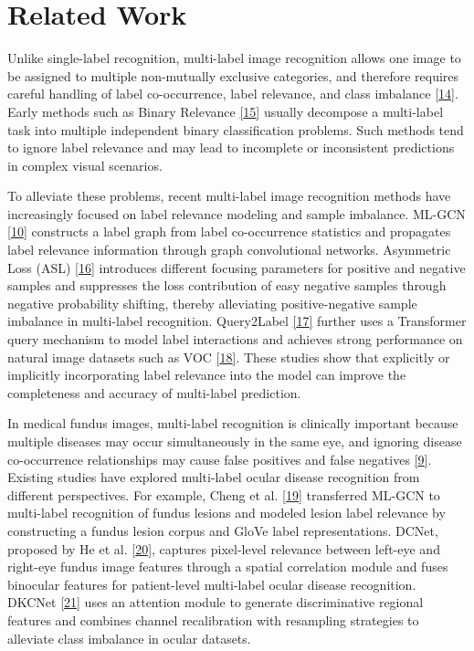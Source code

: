 
\section{Related Work}


Unlike single-label recognition, multi-label image recognition allows one image to be assigned to multiple non-mutually exclusive categories, and therefore requires careful handling of label co-occurrence, label relevance, and class imbalance \hyperref[_Ref213949872]{{[}14{]}}. Early methods such as Binary Relevance \hyperref[_Ref213949896]{{[}15{]}} usually decompose a multi-label task into multiple independent binary classification problems. Such methods tend to ignore label relevance and may lead to incomplete or inconsistent predictions in complex visual scenarios.

To alleviate these problems, recent multi-label image recognition methods have increasingly focused on label relevance modeling and sample imbalance. ML-GCN \hyperref[_Ref213949382]{{[}10{]}} constructs a label graph from label co-occurrence statistics and propagates label relevance information through graph convolutional networks. Asymmetric Loss (ASL) \hyperref[_Ref213949927]{{[}16{]}} introduces different focusing parameters for positive and negative samples and suppresses the loss contribution of easy negative samples through negative probability shifting, thereby alleviating positive-negative sample imbalance in multi-label recognition. Query2Label \hyperref[_Ref213950246]{{[}17{]}} further uses a Transformer query mechanism to model label interactions and achieves strong performance on natural image datasets such as VOC \hyperref[_Ref213950282]{{[}18{]}}. These studies show that explicitly or implicitly incorporating label relevance into the model can improve the completeness and accuracy of multi-label prediction.

In medical fundus images, multi-label recognition is clinically important because multiple diseases may occur simultaneously in the same eye, and ignoring disease co-occurrence relationships may cause false positives and false negatives \hyperref[_Ref213949362]{{[}9{]}}. Existing studies have explored multi-label ocular disease recognition from different perspectives. For example, Cheng et al. \hyperref[_Ref213950349]{{[}19{]}} transferred ML-GCN to multi-label recognition of fundus lesions and modeled lesion label relevance by constructing a fundus lesion corpus and GloVe label representations. DCNet, proposed by He et al. \hyperref[_Ref213950338]{{[}20{]}}, captures pixel-level relevance between left-eye and right-eye fundus image features through a spatial correlation module and fuses binocular features for patient-level multi-label ocular disease recognition. DKCNet \hyperref[_Ref213950343]{{[}21{]}} uses an attention module to generate discriminative regional features and combines channel recalibration with resampling strategies to alleviate class imbalance in ocular datasets.

